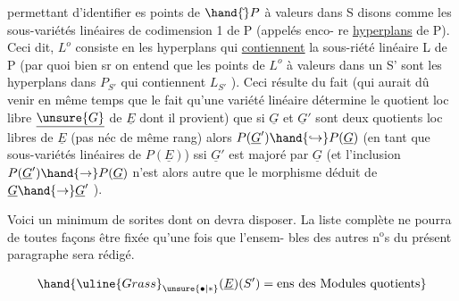  

permettant d'identifier es points de $\hand{\check{}}P$\hand{,} à valeurs dans  S disons\hand{,}
comme les sous-variétés linéaires de codimension 1 de P (appelés enco-%
re \uline{hyperplans} de P). Ceci dit, $L^{o}$ consiste en les hyperplans qui
\uline{contiennent} la sous-riété linéaire L de P (par quoi bien sr on
entend que les points de $L^{o}$  à valeurs dans un S' sont les
hyperplans dans $P_{S'}$ qui contiennent $L_{S'}$ ). Ceci résulte du fait 
\margin{|}(qui aurait dû venir en même temps que le fait qu'une variété linéaire \hand{,}
détermine le quotient loc libre $\underline{\unsure{G}}$ de $\underline{E}$ dont il provient) que si
$\underline{G}$ et $\underline{G}'$ sont deux quotients loc libres de $\underline{E}$ (pas néc de même rang)
alors $P(\underline{G}')\hand{\hookrightarrow}P(\underline{G})$ (en tant que sous-variétés linéaires de $P(\underline{E})$) ssi
$\underline{G}'$ est majoré par $\underline{G}$ (et l'inclusion $P(\underline{G}')\hand{\rightarrow}P(\underline{G})$ n'est alors autre
que le morphisme déduit de $\underline{G}\hand{\rightarrow}\underline{G}'$ ).

Voici un minimum de sorites dont on devra disposer. La liste
complète ne pourra de toutes façons être fixée qu'une fois que l'ensem-%
bles des autres n$^{\text{o}}$s du présent paragraphe sera rédigé.


\[ \hand{\uline{Grass}_{\unsure{\bullet|*}}(\underline{E})(S') = \text{ens des Modules quotients}} \]

\hand{sections de \uline{Grass}$_{\unsure{*}}(\underline{E})$ sur S [NB. le}

